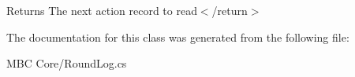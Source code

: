 \begin{DoxyReturn}{Returns}
The next action record to read$<$/return$>$ 
\end{DoxyReturn}


The documentation for this class was generated from the following file\-:\begin{DoxyCompactItemize}
\item 
M\-B\-C Core/Round\-Log.\-cs\end{DoxyCompactItemize}
